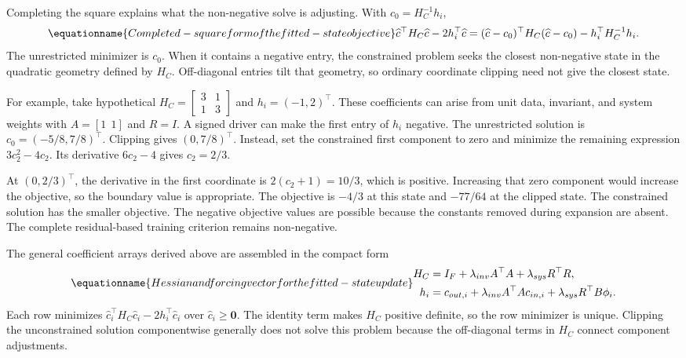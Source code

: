 Completing the square explains what the non-negative solve is adjusting. With \(c_0=H_C^{-1}h_i\),
\begin{equation}
\equationname{Completed-square form of the fitted-state objective}
\label{eq:icsor_state_completed_square}
\widehat c^\top H_C\widehat c-2h_i^\top\widehat c
=(\widehat c-c_0)^\top H_C(\widehat c-c_0)
-h_i^\top H_C^{-1}h_i.
\end{equation}
The unrestricted minimizer is \(c_0\). When it contains a negative entry, the constrained problem seeks the closest non-negative state in the quadratic geometry defined by \(H_C\). Off-diagonal entries tilt that geometry, so ordinary coordinate clipping need not give the closest state.

For example, take hypothetical \(H_C=\begin{bmatrix}3&1\\1&3\end{bmatrix}\) and \(h_i=(-1,2)^\top\). These coefficients can arise from unit data, invariant, and system weights with \(A=[1\ \ 1]\) and \(R=I\). A signed driver can make the first entry of \(h_i\) negative. The unrestricted solution is \(c_0=(-5/8,7/8)^\top\). Clipping gives \((0,7/8)^\top\). Instead, set the constrained first component to zero and minimize the remaining expression \(3c_2^2-4c_2\). Its derivative \(6c_2-4\) gives \(c_2=2/3\).

At \((0,2/3)^\top\), the derivative in the first coordinate is \(2(c_2+1)=10/3\), which is positive. Increasing that zero component would increase the objective, so the boundary value is appropriate. The objective is \(-4/3\) at this state and \(-77/64\) at the clipped state. The constrained solution has the smaller objective. The negative objective values are possible because the constants removed during expansion are absent. The complete residual-based training criterion remains non-negative.

The general coefficient arrays derived above are assembled in the compact form
\begin{equation}
\equationname{Hessian and forcing vector for the fitted-state update}
\label{eq:icsor_state_update}
\begin{aligned}
H_C&=I_F+\lambda_{inv}A^\top A+\lambda_{sys}R^\top R,\\
h_i&=c_{out,i}+\lambda_{inv}A^\top A c_{in,i}
+\lambda_{sys}R^\top B\phi_i.
\end{aligned}
\end{equation}
Each row minimizes \(\widehat c_i^\top H_C\widehat c_i-2h_i^\top\widehat c_i\) over \(\widehat c_i\geq\mathbf{0}\). The identity term makes \(H_C\) positive definite, so the row minimizer is unique. Clipping the unconstrained solution componentwise generally does not solve this problem because the off-diagonal terms in \(H_C\) connect component adjustments.

